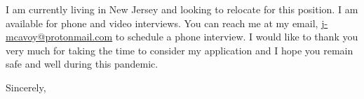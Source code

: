 \documentclass[11pt]{letter} %
\makeatletter
\newcommand{\myemail}{\href{mailto:j-mcavoy@protonmail.com}{j-mcavoy@protonmail.com}}
\makeatother
\begin{document}
\begin{letter}

I am currently living in New Jersey and looking to relocate for this position. I
am available for phone and video interviews. You can reach me at my email,
{\underline \myemail} to schedule a phone interview. I would like to thank you very much for
taking the time to consider my application and I hope you remain safe and well
during this pandemic.

\closing{Sincerely,}



\end{letter}
\end{document}
